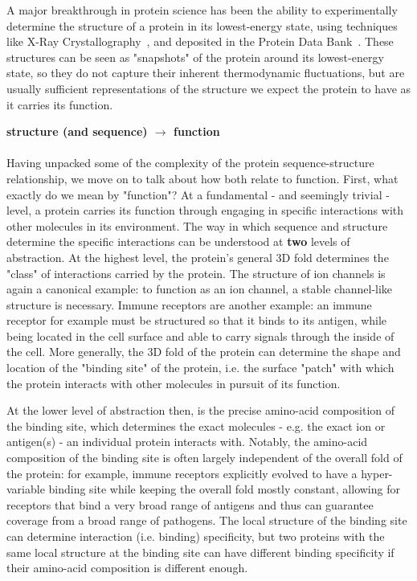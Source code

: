 A major breakthrough in protein science has been the ability to experimentally determine the structure of a protein in its lowest-energy state,
using techniques like X-Ray Crystallography~\citep{rupp_biomolecular_2010}, and deposited in the Protein Data Bank~\citep{berman_protein_2000}.
These structures can be seen as "snapshots" of the protein around its lowest-energy state, so they do not capture their inherent thermodynamic
fluctuations, but are usually sufficient representations of the structure we expect the protein to have as it carries its function.



\textbf{structure (and sequence) $\to$ function}\\
\\
Having unpacked some of the complexity of the protein sequence-structure relationship, we move on to talk about how both
relate to function.
First, what exactly do we mean by "function"? At a fundamental - and seemingly trivial - level, a protein carries its function
through engaging in specific interactions with other molecules in its environment.
The way in which sequence and structure determine the specific interactions can be understood at \textbf{two} levels of abstraction.
At the highest level, the protein's general 3D fold determines the "class" of interactions carried by the protein.
The structure of ion channels is again a canonical example: to function as an ion channel, a stable channel-like structure is necessary.
Immune receptors are another example: an immune receptor for example must be structured so that it binds to its antigen,
while being located in the cell surface and able to carry signals through the inside of the cell.
More generally, the 3D fold of the protein can determine the shape and location of the "binding site" of the protein,
i.e. the surface "patch" with which the protein interacts with other molecules in pursuit of its function.

At the lower level of abstraction then, is the precise amino-acid composition of the binding site, which determines the
exact molecules - e.g. the exact ion or antigen(s) - an individual protein interacts with.
Notably, the amino-acid composition of the binding site is often largely independent of the overall fold of the protein:
for example, immune receptors explicitly evolved to have a hyper-variable binding site while keeping the overall fold mostly
constant, allowing for receptors that bind a very broad range of antigens and thus can guarantee coverage from a broad range
of pathogens.
The local structure of the binding site can determine interaction (i.e. binding) specificity, but two proteins with the same
local structure at the binding site can have different binding specificity if their amino-acid composition is different enough.

